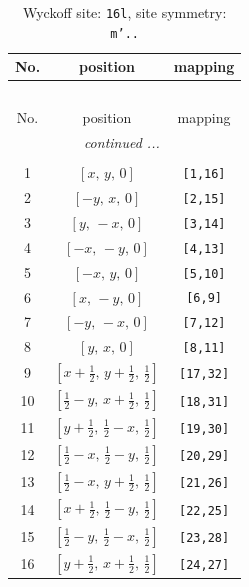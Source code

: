 \documentclass[fleqn,8pt]{jsarticle}
\begin{document}
\renewcommand{\arraystretch}{1.2}
\begin{longtable}{ccc}
\caption{Wyckoff site: {\tt 16l}, site symmetry: {\tt m'..}}
 \\
 \hline \hline
No. & position & mapping \\ \hline \endfirsthead

\multicolumn{2}{l}{\tablename\ \thetable{}} \\
 \hline \hline
No. & position & mapping \\ \hline \endhead

 \hline \hline
\multicolumn{2}{r}{\footnotesize\it continued ...} \\ \endfoot

 \hline \hline
\multicolumn{2}{r}{} \\ \endlastfoot

1 & $\left[ x,\, y,\, 0 \right]$ & {\tt [1,16]} \\ \hline
2 & $\left[ - y,\, x,\, 0 \right]$ & {\tt [2,15]} \\ \hline
3 & $\left[ y,\, - x,\, 0 \right]$ & {\tt [3,14]} \\ \hline
4 & $\left[ - x,\, - y,\, 0 \right]$ & {\tt [4,13]} \\ \hline
5 & $\left[ - x,\, y,\, 0 \right]$ & {\tt [5,10]} \\ \hline
6 & $\left[ x,\, - y,\, 0 \right]$ & {\tt [6,9]} \\ \hline
7 & $\left[ - y,\, - x,\, 0 \right]$ & {\tt [7,12]} \\ \hline
8 & $\left[ y,\, x,\, 0 \right]$ & {\tt [8,11]} \\ \hline
9 & $\left[ x + \frac{1}{2},\, y + \frac{1}{2},\, \frac{1}{2} \right]$ & {\tt [17,32]} \\ \hline
10 & $\left[ \frac{1}{2} - y,\, x + \frac{1}{2},\, \frac{1}{2} \right]$ & {\tt [18,31]} \\ \hline
11 & $\left[ y + \frac{1}{2},\, \frac{1}{2} - x,\, \frac{1}{2} \right]$ & {\tt [19,30]} \\ \hline
12 & $\left[ \frac{1}{2} - x,\, \frac{1}{2} - y,\, \frac{1}{2} \right]$ & {\tt [20,29]} \\ \hline
13 & $\left[ \frac{1}{2} - x,\, y + \frac{1}{2},\, \frac{1}{2} \right]$ & {\tt [21,26]} \\ \hline
14 & $\left[ x + \frac{1}{2},\, \frac{1}{2} - y,\, \frac{1}{2} \right]$ & {\tt [22,25]} \\ \hline
15 & $\left[ \frac{1}{2} - y,\, \frac{1}{2} - x,\, \frac{1}{2} \right]$ & {\tt [23,28]} \\ \hline
16 & $\left[ y + \frac{1}{2},\, x + \frac{1}{2},\, \frac{1}{2} \right]$ & {\tt [24,27]} \\
\end{longtable}
\end{document}

